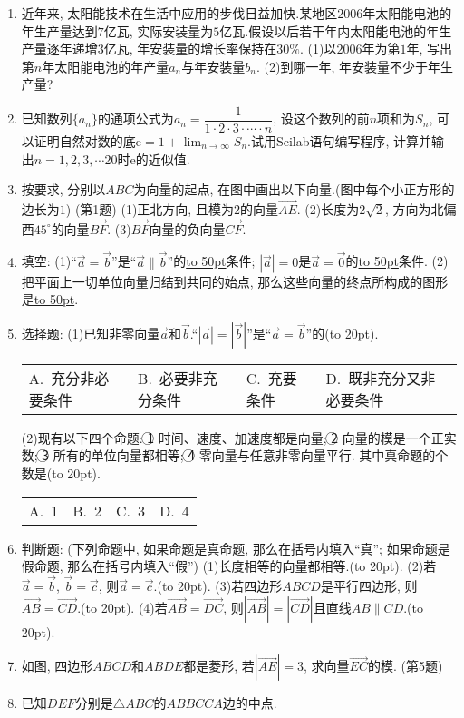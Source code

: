 \documentclass[10pt,a4paper]{article}
\newcommand{\blank}[1]{\underline{\hbox to #1pt{}}}
\newcommand{\bracket}[1]{(\hbox to #1pt{})}
\newcommand{\fourch}[4]{\par\begin{tabular}{p{.23\textwidth}p{.23\textwidth}p{.23\textwidth}p{.23\textwidth}}
A.~#1 &B.~#2& C.~#3& D.~#4
\end{tabular}}
\begin{document}
\begin{enumerate}[1.]
(第15题)
\item 近年来, 太阳能技术在生活中应用的步伐日益加快.某地区$2006$年太阳能电池的年生产量达到$7$亿瓦, 实际安装量为$5$亿瓦.假设以后若干年内太阳能电池的年生产量逐年递增$3$亿瓦, 年安装量的增长率保持在$30\%$.
(1)以$2006$年为第$1$年, 写出第$n$年太阳能电池的年产量$a_n$与年安装量$b_n$.
(2)到哪一年, 年安装量不少于年生产量?
\item 已知数列$\{a_n\}$的通项公式为$a_n=\dfrac 1{1\cdot 2\cdot 3\cdot \cdots \cdot n}$, 设这个数列的前$n$项和为$S_n$, 可以证明自然对数的底$\mathrm{e}=1+\displaystyle\lim_{n\to\infty}S_n$.试用Scilab语句编写程序, 计算并输出$n=1,2,3,\cdots 20$时$\mathrm{e}$的近似值.
\item 按要求, 分别以$ABC$为向量的起点, 在图中画出以下向量.(图中每个小正方形的边长为$1$)
(第1题)
(1)正北方向, 且模为$2$的向量$\overrightarrow{AE}$.
(2)长度为$2\sqrt 2$, 方向为北偏西$45^{\circ }$的向量$\overrightarrow{BF}$.
(3)$\overrightarrow{BF}$向量的负向量$\overrightarrow{CF}$.
\item 填空:
(1)``$\overrightarrow a=\overrightarrow b$''是``$\overrightarrow a\parallel \overrightarrow b$''的\blank{50}条件; $|\overrightarrow a|=0$是$\overrightarrow a=\overrightarrow 0$的\blank{50}条件.
(2)把平面上一切单位向量归结到共同的始点, 那么这些向量的终点所构成的图形是\blank{50}.
\item 选择题:
(1)已知非零向量$\overrightarrow a$和$\overrightarrow b$.``$|\overrightarrow a|=|\overrightarrow b|$''是``$\overrightarrow a=\overrightarrow b$''的\bracket{20}.
\fourch{充分非必要条件}{必要非充分条件}{充要条件}{既非充分又非必要条件}
(2)现有以下四个命题:
\textcircled{1} 时间、速度、加速度都是向量;
\textcircled{2} 向量的模是一个正实数;
\textcircled{3} 所有的单位向量都相等;
\textcircled{4} 零向量与任意非零向量平行.
其中真命题的个数是\bracket{20}.
\fourch{1}{2}{3}{4}
\item 判断题: (下列命题中, 如果命题是真命题, 那么在括号内填入``真''; 如果命题是假命题, 那么在括号内填入``假'')
(1)长度相等的向量都相等.\bracket{20}.
(2)若$\overrightarrow a=\overrightarrow b$, $\overrightarrow b=\overrightarrow c$, 则$\overrightarrow a=\overrightarrow c$.\bracket{20}.
(3)若四边形$ABCD$是平行四边形, 则$\overrightarrow{AB}=\overrightarrow{CD}$.\bracket{20}.
(4)若$\overrightarrow{AB}=\overrightarrow{DC}$, 则$|\overrightarrow{AB}|=|\overrightarrow{CD}|$且直线$AB\parallel CD$.\bracket{20}.
\item 如图, 四边形$ABCD$和$ABDE$都是菱形, 若$|\overrightarrow{AE}|=3$, 求向量$\overrightarrow{EC}$的模.
(第5题)
\item 已知$DEF$分别是$\triangle ABC$的$ABBCCA$边的中点.

\end{enumerate}
\end{document}
